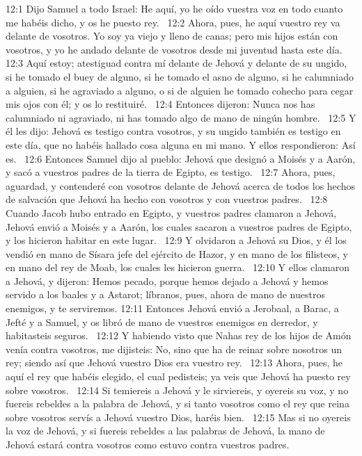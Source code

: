 12:1 Dijo Samuel a todo Israel: He aquí, yo he oído vuestra voz en todo cuanto me habéis dicho, y os he puesto rey.  
12:2 Ahora, pues, he aquí vuestro rey va delante de vosotros. Yo soy ya viejo y lleno de canas; pero mis hijos están con vosotros, y yo he andado delante de vosotros desde mi juventud hasta este día.  
12:3 Aquí estoy; atestiguad contra mí delante de Jehová y delante de su ungido, si he tomado el buey de alguno, si he tomado el asno de alguno, si he calumniado a alguien, si he agraviado a alguno, o si de alguien he tomado cohecho para cegar mis ojos con él; y os lo restituiré.  
12:4 Entonces dijeron: Nunca nos has calumniado ni agraviado, ni has tomado algo de mano de ningún hombre.  
12:5 Y él les dijo: Jehová es testigo contra vosotros, y su ungido también es testigo en este día, que no habéis hallado cosa alguna en mi mano. Y ellos respondieron: Así es.  
12:6 Entonces Samuel dijo al pueblo: Jehová que designó a Moisés y a Aarón, y sacó a vuestros padres de la tierra de Egipto, es testigo.  
12:7 Ahora, pues, aguardad, y contenderé con vosotros delante de Jehová acerca de todos los hechos de salvación que Jehová ha hecho con vosotros y con vuestros padres.  
12:8 Cuando Jacob hubo entrado en Egipto, y vuestros padres clamaron a Jehová, Jehová envió a Moisés y a Aarón, los cuales sacaron a vuestros padres de Egipto, y los hicieron habitar en este lugar.  
12:9 Y olvidaron a Jehová su Dios, y él los vendió en mano de Sísara jefe del ejército de Hazor, y en mano de los filisteos, y en mano del rey de Moab, los cuales les hicieron guerra.  
12:10 Y ellos clamaron a Jehová, y dijeron: Hemos pecado, porque hemos dejado a Jehová y hemos servido a los baales y a Astarot; líbranos, pues, ahora de mano de nuestros enemigos, y te serviremos. 
12:11 Entonces Jehová envió a Jerobaal, a Barac, a Jefté y a Samuel, y os libró de mano de vuestros enemigos en derredor, y habitasteis seguros.  
12:12 Y habiendo visto que Nahas rey de los hijos de Amón venía contra vosotros, me dijisteis: No, sino que ha de reinar sobre nosotros un rey; siendo así que Jehová vuestro Dios era vuestro rey.  
12:13 Ahora, pues, he aquí el rey que habéis elegido, el cual pedisteis; ya veis que Jehová ha puesto rey sobre vosotros.  
12:14 Si temiereis a Jehová y le sirviereis, y oyereis su voz, y no fuereis rebeldes a la palabra de Jehová, y si tanto vosotros como el rey que reina sobre vosotros servís a Jehová vuestro Dios, haréis bien.  
12:15 Mas si no oyereis la voz de Jehová, y si fuereis rebeldes a las palabras de Jehová, la mano de Jehová estará contra vosotros como estuvo contra vuestros padres.  
